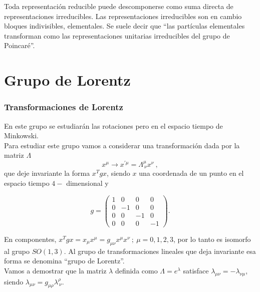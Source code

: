 Toda representación reducible puede descomponerse como suma directa de representaciones irreducibles. Las representaciones irreducibles son en cambio bloques indivisibles, elementales. Se suele decir que ``las partículas elementales transforman como las representaciones unitarias irreducibles del grupo de Poincaré''. 


\section{Grupo de Lorentz}
\subsubsection{Transformaciones de Lorentz}

En este grupo se estudiarán las rotaciones pero en el espacio tiempo de Minkowski.\\
Para estudiar este grupo vamos a considerar una transformación dada por la matriz $\Lambda$
\begin{equation}
    x^{\mu} \rightarrow x^{\prime \mu} = \Lambda^{\mu}_{~\nu}x^{\nu}~,
\end{equation}
que deje invariante la forma $x^{T} g x$, siendo $x$ una coordenada de un punto en el espacio tiempo $4-$ dimensional y 

\begin{equation}
    g = \left( \begin{array}{cccc}
    1 & 0 & 0 & 0 \\ 
    0 & -1 & 0 & 0 \\ 
    0 & 0 & -1 & 0 \\
    0 & 0 & 0 & -1 \end{array} \right).
    \label{matriz_eta}
\end{equation}

En componentes, $x^{T} g x =x_{\mu} x^{\mu}= g_{\mu \nu}x^{\mu}x^{\nu} ~;~\mu=0,1,2,3$, por lo tanto es isomorfo al grupo $SO(1,3)$. Al grupo de transformaciones lineales que deja invariante esa forma se denomina ``grupo de Lorentz''.\\    

Vamos a demostrar que la matriz $\lambda$ definida como $\Lambda=e^{\lambda}$ satisface $\lambda_{\mu \nu} = -\lambda_{\nu \mu}$, siendo $\lambda_{\mu \nu} = g_{\mu \rho}\lambda^{\rho}_{~\nu}$. \\

